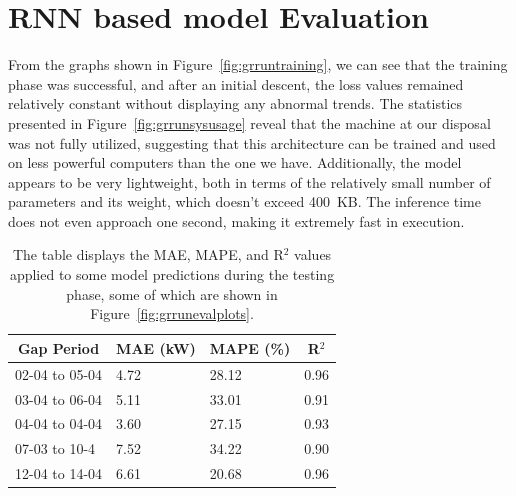 
\section{RNN based model Evaluation}\label{sec:rnneval}
From the graphs shown in Figure~\ref{fig:grruntraining},
we can see that the training phase was successful,
and after an initial descent, the loss values remained relatively
constant without displaying any abnormal trends.
The statistics presented in Figure~\ref{fig:grrunsysusage} reveal
that the machine at our disposal was not fully utilized,
suggesting that this architecture can be trained and used on
less powerful computers than the one we have.
Additionally, the model appears to be very lightweight, both in terms
of the relatively small number of parameters and its weight,
which doesn't exceed 400~KB. The inference time does not even
approach one second, making it extremely fast in execution.

\begin{table}[H]
	\begin{center}
		\begin{tabular}[c]{l|l|l|l}
			\multicolumn{1}{c|}{\textbf{Gap Period}} &
			\multicolumn{1}{c|}{\textbf{MAE (kW)}}   &
			\multicolumn{1}{c|}{\textbf{MAPE (\%)}}  &
			\multicolumn{1}{c}{\textbf{R}$^2$}                             \\
			\hline

			02-04 to 05-04                           & 4.72 & 28.12 & 0.96 \\
			03-04 to 06-04                           & 5.11 & 33.01 & 0.91 \\
			04-04 to 04-04                           & 3.60 & 27.15 & 0.93 \\
			07-03 to 10-4                            & 7.52 & 34.22 & 0.90 \\
			12-04 to 14-04                           & 6.61 & 20.68 & 0.96
		\end{tabular}
	\end{center}
	\caption{The table displays the MAE, MAPE, and R$^2$ values applied to some model predictions during the testing phase, some of which are shown in Figure~\ref{fig:grrunevalplots}.
	}\label{tab:grrunpmaer}
\end{table}


